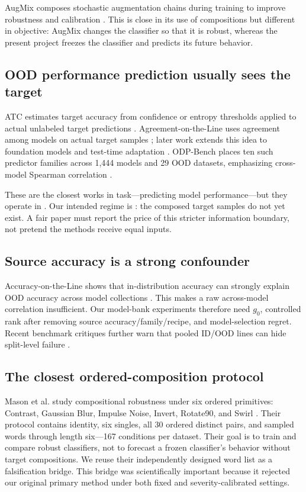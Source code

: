 \documentclass[11pt,a4paper]{article}
\newcommand{\Rtwo}{\mathrm{R2}}
\newcommand{\Rthree}{\mathrm{R3}}
\begin{document}
AugMix composes stochastic augmentation chains during training to improve
robustness and calibration \cite{hendrycks2020}.  This is close in its use of
compositions but different in objective: AugMix changes the classifier so that
it is robust, whereas the present project freezes the classifier and predicts
its future behavior.

\subsection{OOD performance prediction usually sees the target}

ATC estimates target accuracy from confidence or entropy thresholds applied to
actual unlabeled target predictions \cite{garg2022}.  Agreement-on-the-Line
uses agreement among models on actual target samples \cite{baek2022}; later
work extends this idea to foundation models and test-time adaptation
\cite{foundationagreement2024,ttaagreement2024}.  ODP-Bench places ten such
predictor families across 1,444 models and 29 OOD datasets, emphasizing
cross-model Spearman correlation \cite{yu2025}.

These are the closest works in task---predicting model performance---but they
operate in \Rthree{}.  Our intended regime is \Rtwo{}: the composed target
samples do not yet exist.  A fair paper must report the price of this stricter
information boundary, not pretend the methods receive equal inputs.

\subsection{Source accuracy is a strong confounder}

Accuracy-on-the-Line shows that in-distribution accuracy can strongly explain
OOD accuracy across model collections \cite{miller2021}.  This makes a raw
across-model correlation insufficient.  Our model-bank experiments therefore
need $g_0$, controlled rank after removing source accuracy/family/recipe, and
model-selection regret.  Recent benchmark critiques further warn that pooled
ID/OOD lines can hide split-level failure \cite{dgmisspecified2025}.

\subsection{The closest ordered-composition protocol}

Mason et al. study compositional robustness under six ordered primitives:
Contrast, Gaussian Blur, Impulse Noise, Invert, Rotate90, and Swirl
\cite{mason2023}.  Their protocol contains identity, six singles, all 30
ordered distinct pairs, and sampled words through length six---167 conditions
per dataset.  Their goal is to train and compare robust classifiers, not to
forecast a frozen classifier's behavior without target compositions.  We reuse
their independently designed word list as a falsification bridge.  This bridge
was scientifically important because it rejected our original primary method
under both fixed and severity-calibrated settings.
\end{document}
